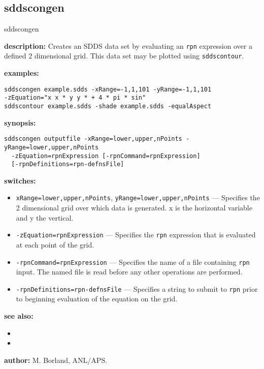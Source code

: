\newpage
\subsection{sddscongen}
\label{sddscongen}

\begin{sddsprog}{sddscongen}
  \item \textbf{description:}
    Creates an SDDS data set by evaluating an \verb|rpn| expression over a defined 2 dimensional grid. This data set may be plotted using \verb|sddscontour|.
  \item \textbf{examples:}
\begin{verbatim}
sddscongen example.sdds -xRange=-1,1,101 -yRange=-1,1,101
-zEquation="x x * y y * + 4 * pi * sin"
sddscontour example.sdds -shade example.sdds -equalAspect
\end{verbatim}
  \item \textbf{synopsis:}
\begin{verbatim}
sddscongen outputfile -xRange=lower,upper,nPoints -yRange=lower,upper,nPoints
  -zEquation=rpnExpression [-rpnCommand=rpnExpression]
  [-rpnDefinitions=rpn-defnsFile]
\end{verbatim}
  \item \textbf{switches:}
    \begin{itemize}
      \item {\tt xRange=lower,upper,nPoints}, {\tt yRange=lower,upper,nPoints} --- Specifies the 2 dimensional grid over which data is generated. x is the horizontal variable and y the vertical.
      \item {\tt -zEquation=rpnExpression} --- Specifies the \verb|rpn| expression that is evaluated at each point of the grid.
      \item {\tt -rpnCommand=rpnExpression} --- Specifies the name of a file containing \verb|rpn| input. The named file is read before any other operations are performed.
      \item {\tt -rpnDefinitions=rpn-defnsFile} --- Specifies a string to submit to \verb|rpn| prior to beginning evaluation of the equation on the grid.
    \end{itemize}
  \item \textbf{see also:}
    \begin{itemize}
      \item {}
      \item {}
    \end{itemize}
  \item \textbf{author:} M. Borland, ANL/APS.
\end{sddsprog}

